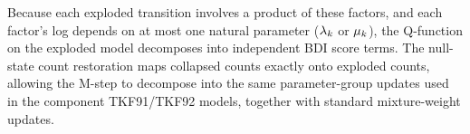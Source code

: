 Because each exploded transition involves a product of these factors,
and each factor's log depends on at most one natural parameter ($\lambda_k$
or $\mu_k$), the Q-function on the exploded model decomposes into
independent BDI score terms.
The null-state count restoration maps collapsed counts exactly onto exploded counts, allowing the M-step to decompose into the same parameter-group updates used in the component TKF91/TKF92 models, together with standard mixture-weight updates.